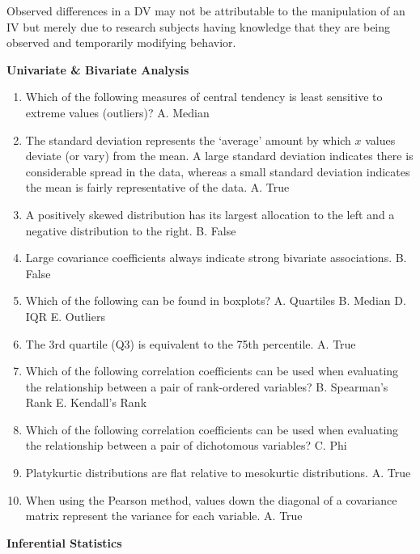 \documentclass[]{book}
\begin{document}
Observed differences in a DV may not be attributable to the manipulation of an IV but merely due to research subjects having knowledge that they are being observed and temporarily modifying behavior.

\textbf{Univariate \& Bivariate Analysis}

\begin{enumerate}
\def\labelenumi{\arabic{enumi}.}
\item
  Which of the following measures of central tendency is least sensitive to extreme values (outliers)?
  A. Median
\item
  The standard deviation represents the `average' amount by which \(x\) values deviate (or vary) from the mean. A large standard deviation indicates there is considerable spread in the data, whereas a small standard deviation indicates the mean is fairly representative of the data.
  A. True
\item
  A positively skewed distribution has its largest allocation to the left and a negative distribution to the right.
  B. False
\item
  Large covariance coefficients always indicate strong bivariate associations.
  B. False
\item
  Which of the following can be found in boxplots?
  A. Quartiles
  B. Median
  D. IQR
  E. Outliers
\item
  The 3rd quartile (Q3) is equivalent to the 75th percentile.
  A. True
\item
  Which of the following correlation coefficients can be used when evaluating the relationship between a pair of rank-ordered variables?
  B. Spearman's Rank
  E. Kendall's Rank
\item
  Which of the following correlation coefficients can be used when evaluating the relationship between a pair of dichotomous variables?
  C. Phi
\item
  Platykurtic distributions are flat relative to mesokurtic distributions.
  A. True
\item
  When using the Pearson method, values down the diagonal of a covariance matrix represent the variance for each variable.
  A. True
\end{enumerate}

\textbf{Inferential Statistics}
\end{document}
